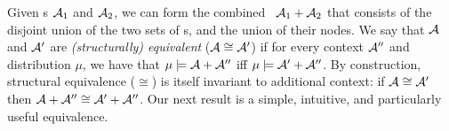 Given \hgraph s $\mathcal A_1$ and $\mathcal A_2$, 
we can form the combined \hgraph\ $\mathcal A_1 + \mathcal A_2$
that consists of the disjoint union of the two sets of \hyperarc s,
    and the union of their nodes.
We say that $\mathcal A$ and $\mathcal A'$ are \emph{(structurally) equivalent}
($\mathcal A \cong \mathcal A'$) if for every context $\mathcal A''$ and distribution $\mu$,  we have that
    $\mu \models \mathcal A + \mathcal A''$ iff $\mu \models \mathcal A' + \mathcal A''$.
%
By construction, structural equivalence ($\cong$) is itself
invariant to additional context:
     if $\mathcal A \cong \mathcal A'$ then
    $\mathcal A + \mathcal A'' \cong \mathcal A' + \mathcal A''$.
Our next result is a simple, intuitive, and particularly useful equivalence.
